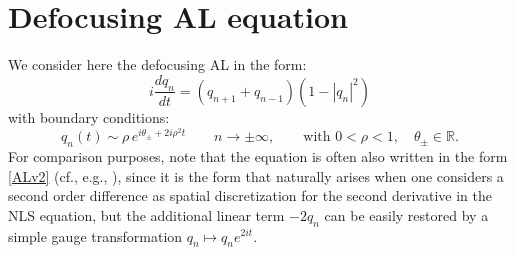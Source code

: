 \documentclass{article}
\def\Real{\mathbb{R}}
\begin{document}
\section{Defocusing AL equation}

We consider here the defocusing AL in the form:
\begin{equation}
\label{e:AL}
 i\frac{dq_n}{dt}%
 =(q_{n+1}+q_{n-1})(1-|q_n|^2) %
\end{equation}
with boundary conditions:
\begin{equation}
q_n(t) \sim \rho\, e^{i\theta_\pm +2i\rho^2 t} \qquad n\to \pm \infty, \qquad \text{with } 0<\rho<1, \quad \theta_\pm \in \Real.    
\end{equation}
For comparison purposes, note that the equation is often also written in the form \eqref{ALv2}
(cf., e.g., \cite{ABP07}), since it is the form that naturally arises when one considers a second order difference as spatial discretization for the second derivative in the NLS equation, but the additional linear term $-2q_n$ can be easily restored by a simple gauge transformation $q_n\mapsto q_n e^{2i t}$.
\end{document}
